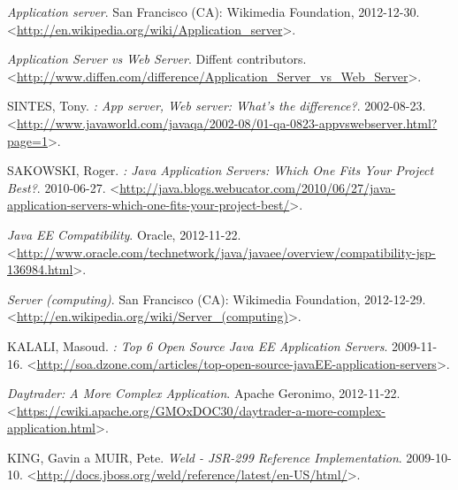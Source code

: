 \documentclass[122pt,oneside]{fithesis}
\begin{document}
\begin{thebibliography}{99}
\emph{Application server}.
San Francisco (CA): Wikimedia Foundation, 2012-12-30.
\textless\href{http://en.wikipedia.org/wiki/Application\_server}{http://en.wikipedia.org/wiki/Application\_server}\textgreater.

\emph{Application Server vs Web Server}.
Diffent contributors.
\textless\href{http://www.diffen.com/difference/Application\_Server\_vs\_Web\_Server}{http://www.diffen.com/difference/Application\_Server\_vs\_Web\_Server}\textgreater.

SINTES, Tony.
\emph{: App server, Web server: What's the difference?}.
2002-08-23.
\textless\href{http://www.javaworld.com/javaqa/2002-08/01-qa-0823-appvswebserver.html?page=1}{http://www.javaworld.com/javaqa/2002-08/01-qa-0823-appvswebserver.html?page=1}\textgreater.

SAKOWSKI, Roger.
\emph{: Java Application Servers: Which One Fits Your Project Best?}.
2010-06-27.
\textless\href{http://java.blogs.webucator.com/2010/06/27/java-application-servers-which-one-fits-your-project-best/}{http://java.blogs.webucator.com/2010/06/27/java-application-servers-which-one-fits-your-project-best/}\textgreater.

\emph{Java EE Compatibility}.
Oracle, 2012-11-22.
\textless\href{http://www.oracle.com/technetwork/java/javaee/overview/compatibility-jsp-136984.html}{http://www.oracle.com/technetwork/java/javaee/overview/compatibility-jsp-136984.html}\textgreater.

\emph{Server (computing)}.
San Francisco (CA): Wikimedia Foundation, 2012-12-29.
\textless\href{http://en.wikipedia.org/wiki/Server\_(computing)}{http://en.wikipedia.org/wiki/Server\_(computing)}\textgreater.

KALALI, Masoud.
\emph{: Top 6 Open Source Java EE Application Servers}.
2009-11-16.
\textless\href{http://soa.dzone.com/articles/top-open-source-javaEE-application-servers}{http://soa.dzone.com/articles/top-open-source-javaEE-application-servers}\textgreater.

\emph{Daytrader: A More Complex Application}.
Apache Geronimo, 2012-11-22.
\textless\href{https://cwiki.apache.org/GMOxDOC30/daytrader-a-more-complex-application.html}{https://cwiki.apache.org/GMOxDOC30/daytrader-a-more-complex-application.html}\textgreater.

KING, Gavin a MUIR, Pete.
\emph{Weld - JSR-299 Reference Implementation}.
2009-10-10.
\textless\href{http://docs.jboss.org/weld/reference/latest/en-US/html/}{http://docs.jboss.org/weld/reference/latest/en-US/html/}\textgreater.


\end{thebibliography}
\end{document}
